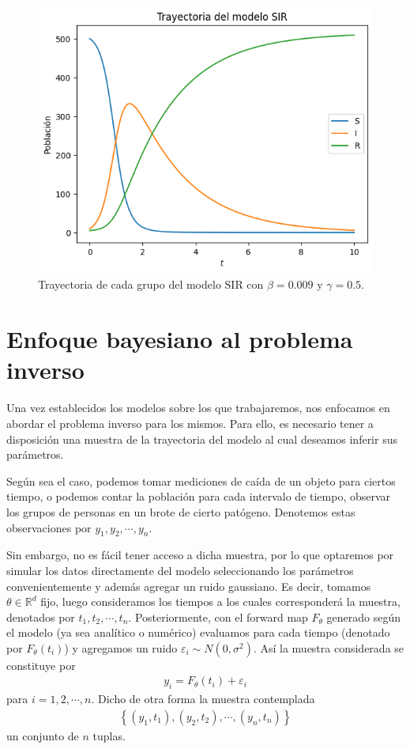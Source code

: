 \begin{figure}
    \centering
    \includegraphics[width = 10 cm]{img/trayectoria_SIR.png}
    \caption{Trayectoria de cada grupo del modelo SIR con $\beta = 0.009$ y $\gamma = 0.5$.}
    \label{fig:trayectoria_SIR}
\end{figure}




\section{Enfoque bayesiano al problema inverso}

Una vez establecidos los modelos sobre los que trabajaremos, nos enfocamos en abordar el problema inverso para los mismos. Para ello, es necesario tener a disposición una muestra de la trayectoria del modelo al cual deseamos inferir sus parámetros.

Según sea el caso, podemos tomar mediciones de caída de un objeto para ciertos tiempo, o podemos contar la población para cada intervalo de tiempo, observar los grupos de personas en un brote de cierto patógeno. Denotemos estas observaciones por $y_1, y_2, \cdots, y_n$. 

Sin embargo, no es fácil tener acceso a dicha muestra, por lo que optaremos por simular los datos directamente del modelo seleccionando los parámetros convenientemente y además agregar un ruido gaussiano. Es decir, tomamos $\theta \in \mathbb{R}^d$ fijo, luego consideramos los tiempos a los cuales corresponderá la muestra, denotados por $t_1, t_2, \cdots, t_n$. Posteriormente, con el forward map $F_{\theta}$ generado según el modelo (ya sea analítico o numérico) evaluamos para cada tiempo (denotado por $F_{\theta}(t_i)$) y agregamos un ruido $\varepsilon_i \sim N(0,\sigma^2)$. Así la muestra considerada se constituye por
\begin{align}
    y_i = F_{\theta}(t_i) + \varepsilon_i %
    \label{3.2.01}
\end{align}
para $i = 1,2, \cdots, n$. Dicho de otra forma la muestra contemplada 
\begin{align}
    \left \{ (y_1,t_1), (y_2, t_2), \cdots, (y_n, t_n)\right \} 
\end{align}
un conjunto de $n$ tuplas.



